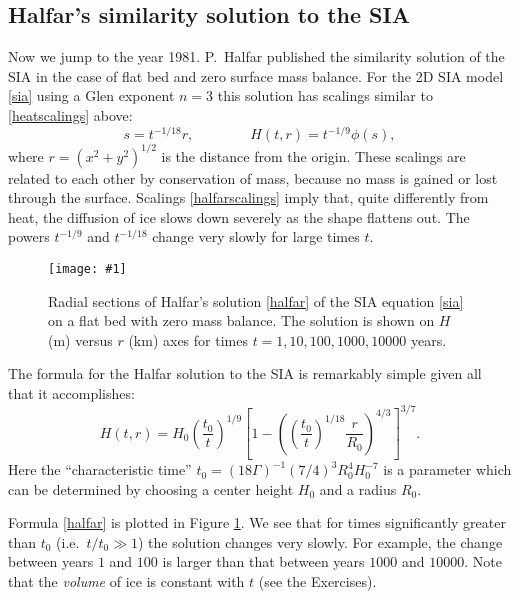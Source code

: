 \documentclass[letterpaper,final,12pt,reqno]{amsart}
\newcommand{\onefigsize}[3]{
\begin{figure}[ht]
\centering
\texttt{[image: \#1]}
\caption{#2}
\label{fig:#1}
\end{figure}}
\begin{document}
\subsection*{Halfar's similarity solution to the SIA}  Now we jump to the year 1981.  P.~Halfar published the similarity solution of the SIA in the case of flat bed and zero surface mass balance.  For the 2D SIA model \eqref{sia} using a Glen exponent $n=3$ this solution has scalings similar to \eqref{heatscalings} above:
\begin{equation}
s = t^{-1/18} r, \qquad \qquad H(t,r)=t^{-1/9} \phi(s), \label{halfarscalings}
\end{equation}
where $r=(x^2+y^2)^{1/2}$ is the distance from the origin.  These scalings are related to each other by conservation of mass, because no mass is gained or lost through the surface. Scalings \eqref{halfarscalings} imply that, quite differently from heat, the diffusion of ice slows down severely as the shape flattens out.  The powers $t^{-1/9}$ and $t^{-1/18}$ change very slowly for large times $t$.

\onefigsize{siascaling}{Radial sections of Halfar's solution \eqref{halfar} of the SIA equation \eqref{sia} on a flat bed with zero mass balance.  The solution is shown on $H$ (m) versus $r$ (km) axes for times $t=1,10,100,1000,10000$ years.}{5.5in}

The formula for the Halfar solution to the SIA is remarkably simple given all that it accomplishes:
\begin{equation}
H(t,r) = H_0 \left(\frac{t_0}{t}\right)^{1/9} \left[1 - \left(\left(\frac{t_0}{t}\right)^{1/18} \frac{r}{R_0}\right)^{4/3}\right]^{3/7}. \label{halfar}
\end{equation}
Here the ``characteristic time'' $t_0 = (18 \Gamma)^{-1} (7/4)^3 R_0^4 H_0^{-7}$ is a parameter which can be determined by choosing a center height $H_0$ and a radius $R_0$.

Formula \eqref{halfar} is plotted in Figure \ref{fig:siascaling}.  We see that for times significantly greater than $t_0$ (i.e.~$t/t_0 \gg 1$) the solution changes very slowly.  For example, the change between years $1$ and $100$ is larger than that between years $1000$ and $10000$.  Note that the \emph{volume} of ice is constant with $t$ (see the Exercises).
\end{document}
